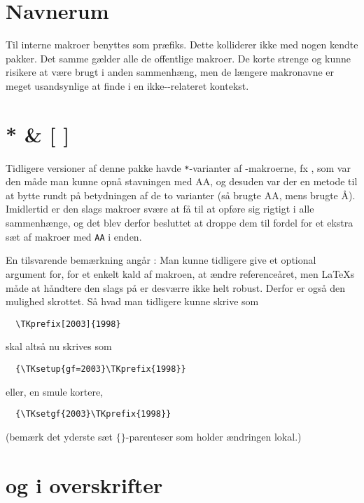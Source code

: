 \documentclass[a4paper,article,oneside,danish]{memoir}
\begin{document}
\section{Navnerum}
\label{sec:navnerum}

Til interne makroer benyttes  som præfiks. Dette kolliderer
ikke med nogen kendte pakker. Det samme gælder alle de offentlige
makroer.  De korte strenge  og  kunne risikere at være
brugt i anden sammenhæng, men de længere makronavne er meget
usandsynlige at finde i en ikke-\TK-relateret kontekst.

\section{* \& [ ]}
\label{sec:-og-}

Tidligere versioner af denne pakke havde \texttt{*}-varianter af
-makroerne, fx , som var den måde man kunne opnå
stavningen med AA, og desuden var der en metode til at bytte rundt på
betydningen af de to varianter (så  brugte AA, mens
 brugte Å). Imidlertid er den slags makroer svære at få til
at opføre sig rigtigt i alle sammenhænge, og det blev derfor besluttet
at droppe dem til fordel for et ekstra sæt af makroer med \texttt{AA}
i enden.

En tilsvarende bemærkning angår : Man kunne tidligere
give et optional argument for, for et enkelt kald af makroen, at ændre
referenceåret, men \LaTeX s måde at håndtere den slags på er desværre
ikke helt robust. Derfor er også den mulighed skrottet. Så hvad man
tidligere kunne skrive som
\begin{verbatim}
  \TKprefix[2003]{1998}
\end{verbatim}
skal altså nu skrives som
\begin{verbatim}
  {\TKsetup{gf=2003}\TKprefix{1998}}
\end{verbatim}
eller, en smule kortere,
\begin{verbatim}
  {\TKsetgf{2003}\TKprefix{1998}}
\end{verbatim}
\fboxsep=0pt
(bemærk det yderste sæt $\{\}$-parenteser som holder ændringen lokal.)

\section{\TKETpdf og \ikonCERMpdf i overskrifter}
\label{sec:tket-i-overskrifter}
\end{document}
